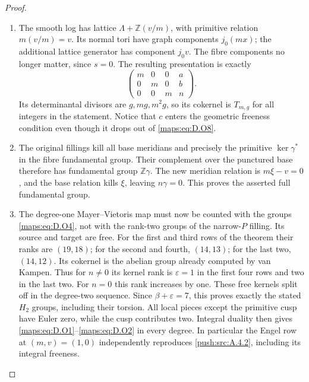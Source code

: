 \begin{proof}
\begin{enumerate}[label=\arabic*.,leftmargin=*]
\item The smooth log has lattice $\Lambda+\mathbb Z(v/m)$,
with primitive relation $m(v/m)=v$.
Its normal tori have graph components $j_0(mx)$;
the additional lattice generator has component $j_0v$.
The fibre components no longer matter, since $s=0$.
The resulting presentation is exactly
\[
  \begin{pmatrix}
    m&0&0&a\\0&m&0&b\\0&0&m&n
  \end{pmatrix}.
 \tag{D.O8}\label{maps:eq:D.O8}
\]
Its determinantal divisors are $g,mg,m^2g$,
so its cokernel is $T_{m,g}$ for all integers in the
statement. Notice that $c$ enters the geometric
freeness condition even though it drops out of \eqref{maps:eq:D.O8}.

\item The original fillings kill all base meridians and
precisely the primitive $\ker\gamma^*$ in the fibre
fundamental group. Their complement over the punctured
base therefore has fundamental group $\mathbb Z\gamma$.
The new meridian relation is $m\xi-v=0$, and the base
relation kills $\xi$, leaving $n\gamma=0$. This proves
the asserted full fundamental group.

\item The degree-one Mayer--Vietoris map must now be counted
with the groups \eqref{maps:eq:D.O4}, not with the rank-two groups of
the narrow-$P$ filling. Its source and target are free.
For the first and third rows of the theorem their ranks
are $(19,18)$; for the second and fourth, $(14,13)$;
for the last two, $(14,12)$.
Its cokernel is the abelian group already computed by
van Kampen. Thus for $n\ne0$ its kernel rank is
$\varepsilon=1$ in the first four rows and two in the
last two. For $n=0$ this rank increases by one.
These free kernels split off in the degree-two sequence.
Since $\beta+\varepsilon=7$, this proves exactly the
stated $H_2$ groups, including their torsion.
All local pieces except the primitive cusp have Euler
zero, while the cusp contributes two. Integral duality
then gives \eqref{maps:eq:D.O1}--\eqref{maps:eq:D.O2} in every degree. In particular
the Engel row at $(m,v)=(1,0)$ independently reproduces
\cref{push:src:A.4.2}, including its integral freeness.


\end{enumerate}
\end{proof}
